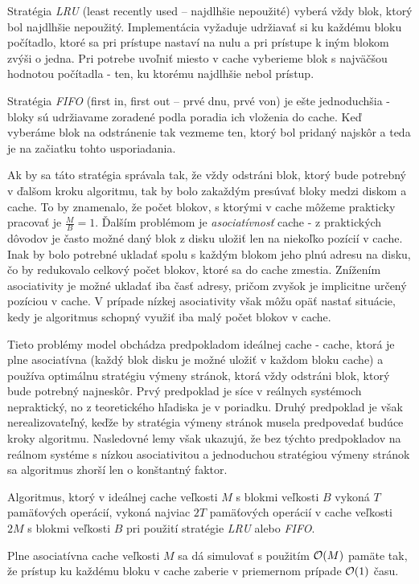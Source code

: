 Stratégia \emph{LRU} (least recently used -- najdlhšie nepoužité) vyberá vždy blok, ktorý bol najdlhšie nepoužitý. Implementácia vyžaduje udržiavať si ku každému bloku počítadlo, ktoré sa pri prístupe nastaví na nulu a pri prístupe k iným blokom zvýši o jedna. Pri potrebe uvoľniť miesto v cache vyberieme blok s najväčšou hodnotou počítadla - ten, ku ktorému najdlhšie nebol prístup.

Stratégia \emph{FIFO} (first in, first out -- prvé dnu, prvé von) je ešte jednoduchšia - bloky sú udržiavame zoradené podla poradia ich vloženia do cache. Keď vyberáme blok na odstránenie tak vezmeme ten, ktorý bol pridaný najskôr a teda je na začiatku tohto usporiadania.

Ak by sa táto stratégia správala tak, že vždy odstráni blok, ktorý bude potrebný v ďalšom kroku algoritmu, tak by bolo zakaždým presúvať bloky medzi diskom a cache. To by znamenalo, že počet blokov, s ktorými v cache môžeme prakticky pracovať je $\frac{M}{B} = 1$. Ďalším problémom je \emph{asociatívnosť} cache - z praktických dôvodov je často možné daný blok z disku uložiť len na niekoľko pozícií v cache. Inak by bolo potrebné ukladať spolu s každým blokom jeho plnú adresu na disku, čo by redukovalo celkový počet blokov, ktoré sa do cache zmestia. Znížením asociativity je možné ukladať iba časť adresy, pričom zvyšok je implicitne určený pozíciou v cache. V prípade nízkej asociativity však môžu opäť nastať situácie, kedy je algoritmus schopný využiť iba malý počet blokov v cache.

Tieto problémy \obliv model obchádza predpokladom ideálnej cache - cache, ktorá je plne asociatívna (každý blok disku je možné uložiť v každom bloku cache) a používa optimálnu stratégiu výmeny stránok, ktorá vždy odstráni blok, ktorý bude potrebný najneskôr. Prvý predpoklad je síce v reálnych systémoch nepraktický, no z teoretického hľadiska je v poriadku. Druhý predpoklad je však nerealizovateľný, keďže by stratégia výmeny stránok musela predpovedať budúce kroky algoritmu. Nasledovné lemy však ukazujú, že bez týchto predpokladov na reálnom systéme s nízkou asociativitou a jednoduchou stratégiou výmeny stránok sa algoritmus zhorší len o konštantný faktor.

\begin{lema}
Algoritmus, ktorý v ideálnej cache veľkosti $M$ s blokmi veľkosti $B$ vykoná $T$ pamäťových operácií, vykoná najviac $2T$ pamäťových operácií v cache veľkosti $2M$ s blokmi veľkosti $B$ pri použití stratégie \emph{LRU} alebo \emph{FIFO}. \citep[Lemma 12]{frigo1999cache}
\end{lema}

\begin{lema}
Plne asociatívna cache veľkosti $M$ sa dá simulovať s použitím $\mathcal{O}(M)$ pamäte tak, že prístup ku každému bloku v cache zaberie v priemernom prípade $\mathcal{O}(1)$ času. \citep[Lemma 16]{frigo1999cache}
\end{lema}